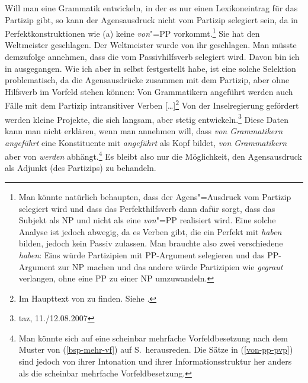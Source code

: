 Will man eine Grammatik entwickeln, in der es nur einen Lexikoneintrag für das Partizip gibt,
so kann der Agensausdruck nicht vom Partizip selegiert sein, da in Perfektkonstruktionen
wie (a) keine \emph{von}"=PP vorkommt.\footnote{
  Man könnte natürlich behaupten, dass der Agens"=Ausdruck vom Partizip selegiert wird
  und dass das Perfekthilfsverb dann dafür sorgt, dass das Subjekt als NP und 
  nicht als eine \emph{von}"=PP realisiert wird. Eine solche Analyse ist jedoch abwegig,
  da es Verben gibt, die ein Perfekt mit \emph{haben} bilden, jedoch kein Passiv zulassen.
  \eal
  \zl
  Man brauchte also zwei verschiedene \emph{haben}: Eins würde Partizipien mit PP-Argument
  selegieren und das PP-Argument zur NP machen und das andere würde Partizipien wie \emph{gegraut}
  verlangen, ohne eine PP zu einer NP umzuwandeln.
}
\eal
\ex Sie hat den Weltmeister geschlagen.
\ex Der Weltmeister wurde von ihr geschlagen.
\zl
Man müsste demzufolge annehmen, dass die \vonpp vom Passivhilfsverb selegiert wird. Davon bin ich
in  ausgegangen. Wie ich aber in  selbst festgestellt habe, ist eine solche Selektion problematisch,
da die Agensausdrücke zusammen mit dem Partizip, aber ohne Hilfsverb im Vorfeld stehen können:
\eal
\label{von-pp-pvp}
\ex Von Grammatikern angeführt werden auch Fälle mit dem Partizip intransitiver Verben [\ldots]\footnote{
        Im Haupttext von  zu finden. Siehe .
}
\ex Von der Inselregierung gefördert werden kleine Projekte, die sich langsam, aber stetig
        entwickeln.\footnote{
          taz, 11./12.08.2007
}
\zl
Diese Daten kann man nicht erklären, wenn man annehmen will, dass \emph{von Grammatikern angeführt} eine
Konstituente mit \emph{angeführt} als Kopf bildet, \emph{von Grammatikern} aber von \emph{werden} abhängt.\footnote{
  Man könnte sich auf eine scheinbar mehrfache Vorfeldbesetzung nach dem Muster von (\ref{bsp-mehr-vf})
  auf S.\,\pageref{bsp-mehr-vf} herausreden. Die Sätze in (\ref{von-pp-pvp}) sind jedoch
  von ihrer Intonation und ihrer Informationsstruktur her anders als die scheinbar mehrfache Vorfeldbesetzung.%
}
Es bleibt also nur die Möglichkeit, den Agensausdruck als Adjunkt (des Partizips) zu behandeln.

